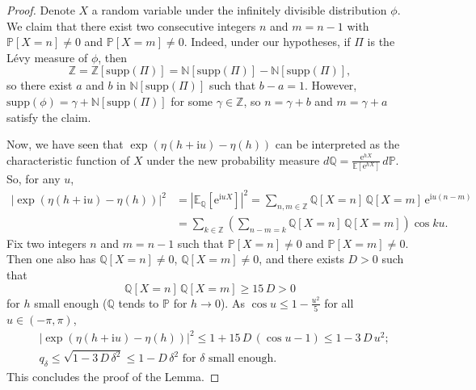 \documentclass[12pt,a4paper,reqno]{amsart}
\theoremstyle{remark}
\newcommand{\N}{\mathbb{N}}
\newcommand{\Z}{\mathbb{Z}}
\newcommand{\E}{\mathrm{e}}
\newcommand{\I}{\mathrm{i}}
\newcommand{\esper}{\mathbb{E}}
\newcommand{\proba}{\mathbb{P}}
\newcommand{\supp}{\mathrm{supp}}
\begin{document}
\begin{proof}
Denote $X$ a random variable under the infinitely divisible distribution $\phi$. We claim that there exist two consecutive integers $n$ and $m=n-1$ with $\proba[X=n]\neq 0$ and $\proba[X=m]\neq 0$. Indeed, under our hypotheses, if $\Pi$ is the L\'evy measure of $\phi$, then 
$$\Z=\Z[\supp(\Pi)]=\N[\supp(\Pi)]-\N[\supp(\Pi)],$$ 
so there exist $a$ and $b$ in $\N[\supp(\Pi)]$ such that $b-a=1$. However, $\supp(\phi)=\gamma+\N[\supp(\Pi)]$ for some $\gamma \in \Z$, so $n=\gamma+b$ and $m=\gamma+a$ satisfy the claim.\bigskip

Now, we have seen that $\exp(\eta(h+\I u)-\eta(h))$ can be interpreted as the characteristic function of $X$ under the new probability measure $d\mathbb{Q}=\frac{\E^{hX}}{\esper[\E^{hX}]}\,d\proba$. So, for any $u$,
\begin{align*}
|\exp(\eta(h+\I u)-\eta(h))|^{2}&=\left|\esper_{\mathbb{Q}}[\E^{\I u X}]\right|^{2} = \sum_{n,m \in \Z} \mathbb{Q}[X=n]\,\mathbb{Q}[X=m]\,\E^{\I u (n-m)} \\
&= \sum_{k \in \Z}  \left(\sum_{n-m=k} \mathbb{Q}[X=n]\,\mathbb{Q}[X=m] \right)\cos ku.
\end{align*}
Fix two integers $n$ and $m=n-1$ such that $\proba[X=n]\neq 0$ and $\proba[X=m]\neq 0$. Then one also has $\mathbb{Q}[X=n]\neq 0$, $\mathbb{Q}[X=m]\neq 0$, and there exists
$D >0$ such that
$$\mathbb{Q}[X=n]\,\mathbb{Q}[X=m] \geq 15\,D>0$$
for $h$ small enough ($\mathbb{Q}$ tends to $\mathbb{P}$ for $h\to 0$).
As $\cos u \leq 1-\frac{u^{2}}{5}$ for all $u \in (-\pi,\pi)$, 
\begin{align*}
&|\exp(\eta(h+\I u)-\eta(h))|^{2} \leq 1+15\,D\,(\cos u-1) \leq 1-3\,D\,u^{2};\\ 
&q_{\delta} \leq \sqrt{1-3\,D\,\delta^{2}} \leq 1-D\,\delta^{2} \text{ for $\delta$ small enough}.
\end{align*}
This concludes the proof of the Lemma.\end{proof}
\medskip
\end{document}
